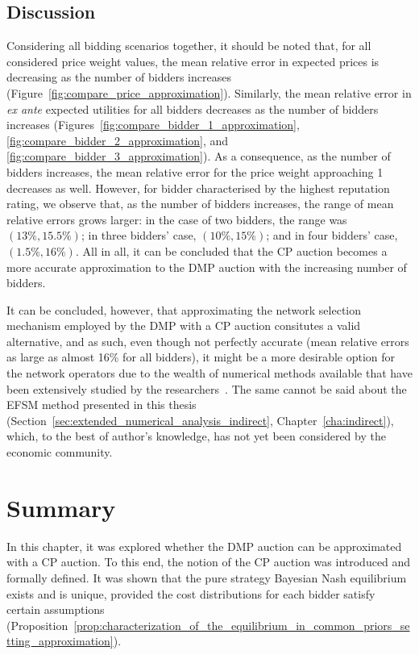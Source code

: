 \subsection{Discussion} %
\label{sub:discussion_approximation}
Considering all bidding scenarios together, it should be noted that, for all considered price weight values, the mean relative error in expected prices is decreasing as the number of bidders increases (Figure~\ref{fig:compare_price_approximation}). Similarly, the mean relative error in \emph{ex ante} expected utilities for all bidders decreases as the number of bidders increases (Figures~\ref{fig:compare_bidder_1_approximation}, \ref{fig:compare_bidder_2_approximation}, and \ref{fig:compare_bidder_3_approximation}). As a consequence, as the number of bidders increases, the mean relative error for the price weight approaching 1 decreases as well. However, for bidder characterised by the highest reputation rating, we observe that, as the number of bidders increases, the range of mean relative errors grows larger: in the case of two bidders, the range was $(13\%, 15.5\%)$; in three bidders' case, $(10\%, 15\%)$; and in four bidders' case, $(1.5\%, 16\%)$. All in all, it can be concluded that the CP auction becomes a more accurate approximation to the DMP auction with the increasing number of bidders.

It can be concluded, however, that approximating the network selection mechanism employed by the DMP with a CP auction consitutes a valid alternative, and as such, even though not perfectly accurate (mean relative errors as large as almost 16\% for all bidders), it might be a more desirable option for the network operators due to the wealth of numerical methods available that have been extensively studied by the researchers~\cite{HubbardPaarsch2011}. The same cannot be said about the EFSM method presented in this thesis (Section~\ref{sec:extended_numerical_analysis_indirect}, Chapter~\ref{cha:indirect}), which, to the best of author's knowledge, has not yet been considered by the economic community.

\section{Summary} %
\label{sec:summary_approximation}
In this chapter, it was explored whether the DMP auction can be approximated with a CP auction. To this end, the notion of the CP auction was introduced and formally defined. It was shown that the pure strategy Bayesian Nash equilibrium exists and is unique, provided the cost distributions for each bidder satisfy certain assumptions (Proposition~\ref{prop:characterization_of_the_equilibrium_in_common_priors_setting_approximation}).

